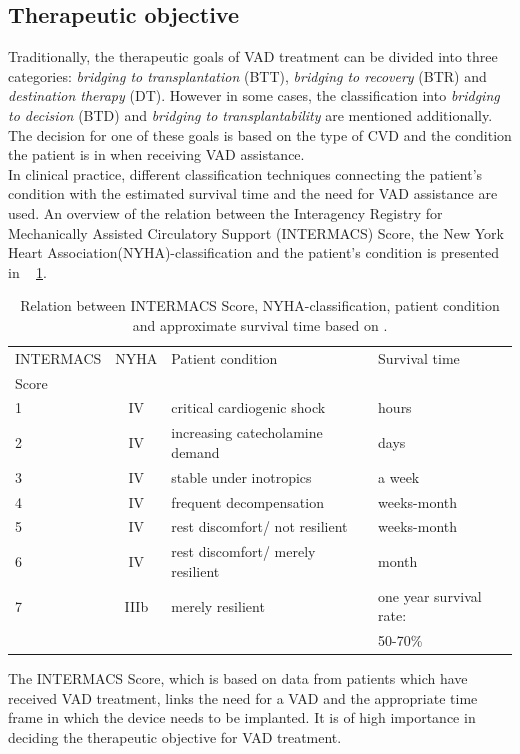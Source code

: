 \subsection{Therapeutic objective}
Traditionally, the therapeutic goals of VAD treatment can be divided into three categories: \textit{bridging to transplantation} (BTT), \textit{bridging to recovery} (BTR) and \textit{destination therapy} (DT). However in some cases, the classification into \textit{bridging to decision} (BTD) and \textit{bridging to transplantability} are mentioned additionally. The decision for one of these goals is based on the type of CVD and the condition the patient is in when receiving VAD assistance. \cite{VAD6}
\\In clinical practice, different classification techniques connecting the patient's condition with the estimated survival time and the need for VAD assistance are used. An overview of the relation between the Interagency Registry for Mechanically Assisted Circulatory Support (INTERMACS) Score, the New York Heart Association(NYHA)-classification and the patient's condition is presented in \tablename~ \ref{tab:Table1}.
\begin{table}[ht]
  \begin{tabularx}{\textwidth}{l|c|l|l}
    \toprule
    INTERMACS & NYHA & Patient condition & Survival time  \\
    Score & & &\\
    \midrule
    1 & IV & critical cardiogenic shock & hours \\
    2 & IV & increasing catecholamine demand & days \\
    3 & IV & stable under inotropics & a week \\
    4 & IV & frequent decompensation & weeks-month \\
    5 & IV & rest discomfort/ not resilient & weeks-month \\
    6 & IV & rest discomfort/ merely resilient & month \\
    7 & IIIb & merely resilient & one year survival rate: \\
     & & & 50-70\% \\
     \bottomrule
  \end{tabularx}
  \caption[Relation between INTERMACS Score and NYHA-classification]{Relation between INTERMACS Score, NYHA-classification, patient condition and approximate survival time based on \cite{VAD5}.}
  \label{tab:Table1}
\end{table}
The INTERMACS Score, which is based on data from patients which have received VAD treatment, links the need for a VAD and the appropriate time frame in which the device needs to be implanted. It is of high importance in deciding the therapeutic objective for VAD treatment. \cite{VAD7}

